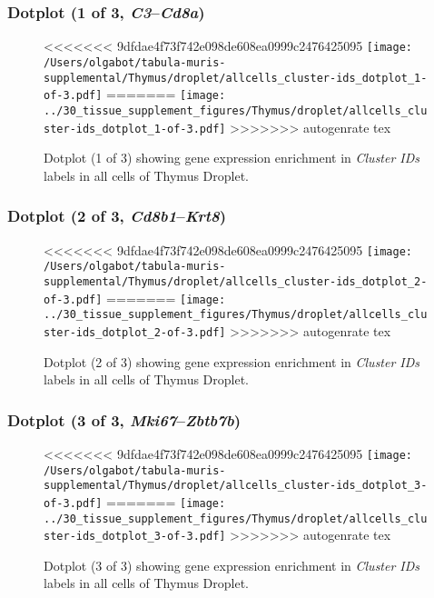 \clearpage

\subsubsection{Dotplot (1 of 3, \emph{C3}--\emph{Cd8a})}
\begin{figure}[h]
\centering
<<<<<<< 9dfdae4f73f742e098de608ea0999c2476425095
\texttt{[image: /Users/olgabot/tabula-muris-supplemental/Thymus/droplet/allcells\_cluster-ids\_dotplot\_1-of-3.pdf]}
=======
\texttt{[image: ../30\_tissue\_supplement\_figures/Thymus/droplet/allcells\_cluster-ids\_dotplot\_1-of-3.pdf]}
>>>>>>> autogenrate tex

\caption{ Dotplot (1 of 3)  showing gene expression enrichment in \emph{Cluster IDs} labels in all cells of Thymus Droplet. }
\end{figure}


\clearpage

\subsubsection{Dotplot (2 of 3, \emph{Cd8b1}--\emph{Krt8})}
\begin{figure}[h]
\centering
<<<<<<< 9dfdae4f73f742e098de608ea0999c2476425095
\texttt{[image: /Users/olgabot/tabula-muris-supplemental/Thymus/droplet/allcells\_cluster-ids\_dotplot\_2-of-3.pdf]}
=======
\texttt{[image: ../30\_tissue\_supplement\_figures/Thymus/droplet/allcells\_cluster-ids\_dotplot\_2-of-3.pdf]}
>>>>>>> autogenrate tex

\caption{ Dotplot (2 of 3)  showing gene expression enrichment in \emph{Cluster IDs} labels in all cells of Thymus Droplet. }
\end{figure}


\clearpage

\subsubsection{Dotplot (3 of 3, \emph{Mki67}--\emph{Zbtb7b})}
\begin{figure}[h]
\centering
<<<<<<< 9dfdae4f73f742e098de608ea0999c2476425095
\texttt{[image: /Users/olgabot/tabula-muris-supplemental/Thymus/droplet/allcells\_cluster-ids\_dotplot\_3-of-3.pdf]}
=======
\texttt{[image: ../30\_tissue\_supplement\_figures/Thymus/droplet/allcells\_cluster-ids\_dotplot\_3-of-3.pdf]}
>>>>>>> autogenrate tex

\caption{ Dotplot (3 of 3)  showing gene expression enrichment in \emph{Cluster IDs} labels in all cells of Thymus Droplet. }
\end{figure}


